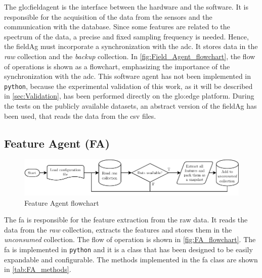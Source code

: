 The \gls{glo:fieldagent} is the interface between the hardware and the software. It is responsible for the acquisition of the data from the sensors and the communication with the database. Since some features are related to the spectrum of the data, a precise and fixed sampling frequency is needed. Hence, the \gls{fieldAg} must incorporate a synchronization with the \gls{adc}. It stores data in the \emph{raw} collection and the \emph{backup} collection. In \autoref{fig:Field_Agent_flowchart}, the flow of operations is shown as a flowchart, emphasizing the importance of the synchronization with the \gls{adc}. This software agent has not been implemented in \texttt{python}, because the experimental validation of this work, as it will be described in \autoref{sec:Validation}, has been performed directly on the \gls{glo:edge} platform. During the tests on the publicly available datasets, an abstract version of the \gls{fieldAg} has been used, that reads the data from the \gls{csv} files.


\subsection{Feature Agent (FA)}
\label{subsec:FeatureAgent}
\begin{figure}
    \centering
    \includegraphics[width=\textwidth]{images/Framework/FA_flowchart.pdf}
    \caption{Feature Agent flowchart}
    \label{fig:FA_flowchart}
\end{figure}

The \gls{fa} is responsible for the feature extraction from the raw data. It reads the data from the \emph{raw} collection, extracts the features and stores them in the \emph{unconsumed} collection. The flow of operation is shown in \autoref{fig:FA_flowchart}. The \gls{fa} is implemented in \texttt{python} and it is a class that has been designed to be easily expandable and configurable. The methods implemented in the \gls{fa} class are shown in \autoref{tab:FA_methods}.


